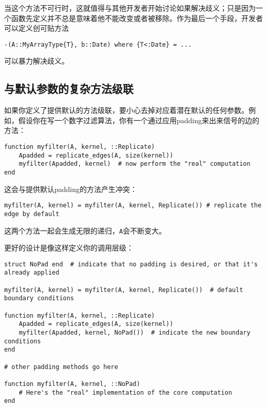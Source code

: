 当这个方法不可行时，这就值得与其他开发者开始讨论如果解决歧义；只是因为一个函数先定义并不总是意味着他不能改变或者被移除。作为最后一个手段，开发者可以定义{\textquotedbl}创可贴{\textquotedbl}方法




\begin{verbatim}
-(A::MyArrayType{T}, b::Date) where {T<:Date} = ...
\end{verbatim}



可以暴力解决歧义。



\hypertarget{5733743229509139145}{}


\subsection{与默认参数的复杂方法{\textquotedbl}级联{\textquotedbl}}



如果你定义了提供默认的方法{\textquotedbl}级联{\textquotedbl}，要小心去掉对应着潜在默认的任何参数。例如，假设你在写一个数字过滤算法，你有一个通过应用padding来出来信号的边的方法：




\begin{verbatim}
function myfilter(A, kernel, ::Replicate)
    Apadded = replicate_edges(A, size(kernel))
    myfilter(Apadded, kernel)  # now perform the "real" computation
end
\end{verbatim}



这会与提供默认padding的方法产生冲突：




\begin{verbatim}
myfilter(A, kernel) = myfilter(A, kernel, Replicate()) # replicate the edge by default
\end{verbatim}



这两个方法一起会生成无限的递归，\texttt{A}会不断变大。



更好的设计是像这样定义你的调用层级：




\begin{verbatim}
struct NoPad end  # indicate that no padding is desired, or that it's already applied

myfilter(A, kernel) = myfilter(A, kernel, Replicate())  # default boundary conditions

function myfilter(A, kernel, ::Replicate)
    Apadded = replicate_edges(A, size(kernel))
    myfilter(Apadded, kernel, NoPad())  # indicate the new boundary conditions
end

# other padding methods go here

function myfilter(A, kernel, ::NoPad)
    # Here's the "real" implementation of the core computation
end
\end{verbatim}



